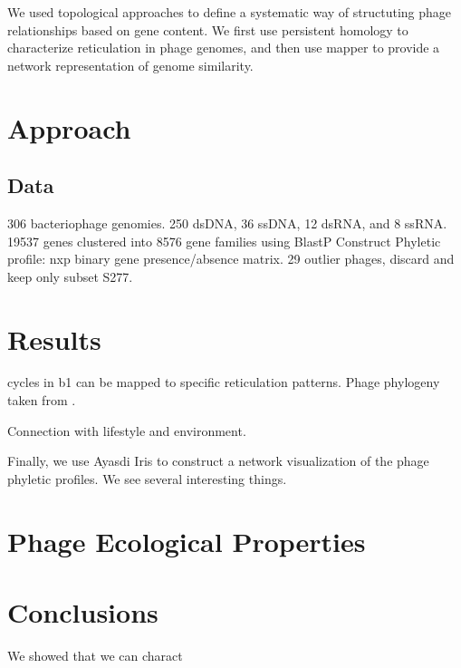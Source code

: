 We used topological approaches to define a systematic way of structuting phage relationships based on gene content.
We first use persistent homology to characterize reticulation in phage genomes, and then use mapper to provide a network representation of genome similarity.

\section{Approach}
\label{phage:sec:approach}

\subsection{Data}

306 bacteriophage genomies.
250 dsDNA, 36 ssDNA, 12 dsRNA, and 8 ssRNA.
19537 genes clustered into 8576 gene families using BlastP
Construct Phyletic profile: nxp binary gene presence/absence matrix.
29 outlier phages, discard and keep only subset S277.

\section{Results}
\label{phage:sec:results}

cycles in b1 can be mapped to specific reticulation patterns.
Phage phylogeny taken from \cite{Glazko:2007dc}.

Connection with lifestyle and environment.

Finally, we use Ayasdi Iris to construct a network visualization of the phage phyletic profiles.
We see several interesting things.

\section{Phage Ecological Properties}

\section{Conclusions}
\label{phage:sec:conclusions}

We showed that we can charact